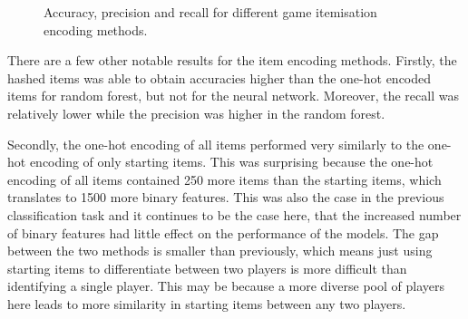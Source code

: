 \documentclass[Report.tex]{subfiles}
\newcommand{\baraxis}[8]{
\begin{axis}[
    ybar,
    title={#1},
    width=#5,
    height=#6,
    ymin=#3, ymax=#4,
    bar width=1em,
    legend style={at={#7},anchor=north,legend columns=-1},
    enlarge x limits=0.4,
    x tick label style={align=center,text width=#8},
    symbolic x coords={Logistic Regression, Random Forest, Multi-layer Perceptron},
    xtick=data,
    ylabel={#2}
]
}
\newcommand{\plotbar}[5]{
\addplot+[
	discard if not={numSplits}{#1},
	discard if not={split}{#2},
	discard if not={features}{#3},
] table [x=model, y=#4,col sep=comma] {data/19-pair-cv.csv};
\addlegendentry{#5}
}
\begin{document}
\begin{figure}[H]
\centering
\centering
{}


\caption{Accuracy, precision and recall for different game itemisation encoding methods.}
\end{figure}

There are a few other notable results for the item encoding methods. Firstly, the hashed items was able to obtain accuracies higher than the one-hot encoded items for random forest, but not for the neural network. Moreover, the recall was relatively lower while the precision was higher in the random forest. 

Secondly, the one-hot encoding of all items performed very similarly to the one-hot encoding of only starting items. This was surprising because the one-hot encoding of all items contained 250 more items than the starting items, which translates to 1500 more binary features. This was also the case in the previous classification task and it continues to be the case here, that the increased number of binary features had little effect on the performance of the models. The gap between the two methods is smaller than previously, which means just using starting items to differentiate between two players is more difficult than identifying a single player. This may be because a more diverse pool of players here leads to more similarity in starting items between any two players. 
\end{document}
